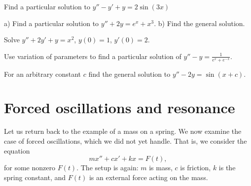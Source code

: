 \documentclass[12pt]{book}
\begin{document}
\setcounter{exercise}{100}

\begin{exercise}
Find a particular solution to $y''-y'+y=2\sin(3x)$
\end{exercise}

\begin{exercise}
a) Find a particular solution to $y''+2y=e^x + x^3$.
b) Find the general solution.
\end{exercise}

\begin{exercise}
Solve $y''+2y'+y = x^2$, $y(0)=1$, $y'(0)=2$.
\end{exercise}

\begin{exercise}
Use variation of parameters to
find a particular solution of $y''-y = \frac{1}{e^x+e^{-x}}$.
\end{exercise}

\begin{exercise}
For an arbitrary constant $c$ find the general solution
to $y''-2y=\sin(x+c)$.
\end{exercise}




\sectionnewpage
\section{Forced oscillations and resonance} \label{forcedo:section}


\begin{diffyfloatingfigure}{2.0in}{2.3in}
\noindent
{}
\end{diffyfloatingfigure}
Let us return back to the example of a mass on a spring.  We now examine
the case of forced oscillations, which we did not yet handle.  That is, we consider the equation
\begin{equation*}
mx'' + cx' + kx = F(t) ,
\end{equation*}
for some nonzero $F(t)$.  The setup
is again: $m$ is mass, $c$ is friction, $k$ is the spring constant, and
$F(t)$ is an external force acting on the mass.
\end{document}
